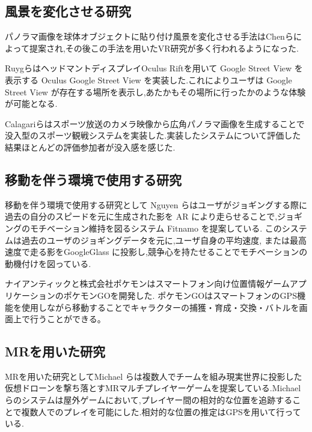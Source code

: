 \clearpage

\subsection{風景を変化させる研究}
パノラマ画像を球体オブジェクトに貼り付け風景を変化させる手法はChenらによって提案され\cite{shenchang},その後この手法を用いたVR研究が多く行われるようになった.

RuygらはヘッドマントディスプレイOculus Riftを用いて Google Street View を表示する Oculus Google Street View を実装した\cite{oculus}.これによりユーザは Google Street View が存在する場所を表示し,あたかもその場所に行ったかのような体験が可能となる.

Calagariらはスポーツ放送のカメラ映像から広角パノラマ画像を生成することで没入型のスポーツ観戦システムを実装した.実装したシステムについて評価した結果ほとんどの評価参加者が没入感を感じた\cite{sprots}.

\clearpage

\subsection{移動を伴う環境で使用する研究}
移動を伴う環境で使用する研究として
Nguyen らはユーザがジョギングする際に過去の自分のスピードを元に生成された影を AR により走らせることで,ジョギングのモチベーション維持を図るシステム Fitnamo を提案している\cite{fitnamo}. このシステムは過去のユーザのジョギングデータを元に,ユーザ自身の平均速度, または最高速度で走る影をGoogleGlass に投影し,競争心を持たせることでモチベーションの動機付けを図っている. 

ナイアンティックと株式会社ポケモンはスマートフォン向け位置情報ゲームアプリケーションのポケモンGOを開発した\cite{pokego}.
ポケモンGOはスマートフォンのGPS機能を使用しながら移動することでキャラクターの捕獲・育成・交換・バトルを画面上で行うことができる。

\clearpage

\subsection{MRを用いた研究}
MRを用いた研究としてMichael らは複数人でチームを組み現実世界に投影した仮想ドローンを撃ち落とすMRマルチプレイヤーゲームを提案している\cite{mrgame}.Michaelらのシステムは屋外ゲームにおいて,プレイヤー間の相対的な位置を追跡することで複数人でのプレイを可能にした.相対的な位置の推定はGPSを用いて行っている. 

